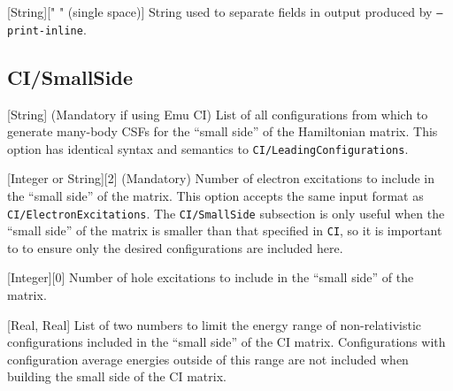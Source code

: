 \documentclass{report}
\begin{document}

[String][" " (single space)]{%
String used to separate fields in output produced by \texttt{--print-inline}.%
}


\subsection{CI/SmallSide}
[String]{%
(Mandatory if using Emu CI) List of all configurations from which to generate many-body CSFs for the
``small side'' of the Hamiltonian matrix. This option has identical syntax and semantics to
\texttt{CI/LeadingConfigurations}.%
}

[Integer or String][2]{%
(Mandatory) Number of electron excitations to include in the ``small side'' of the matrix. This option
accepts the same input format as \texttt{CI/ElectronExcitations}. The \texttt{CI/SmallSide} subsection
is only useful when the ``small side'' of the matrix is smaller than that specified in \texttt{CI}, so
it is important to to ensure only the desired configurations are included here.%
}

[Integer][0]{%
Number of hole excitations to include in the ``small side'' of the matrix.%
}



[Real, Real]{%
List of two numbers to limit the energy range of non-relativistic configurations included in the ``small
side'' of the CI matrix.
Configurations with configuration average energies outside of this range are not included when building
the small side of the CI matrix.%
}
\end{document}
